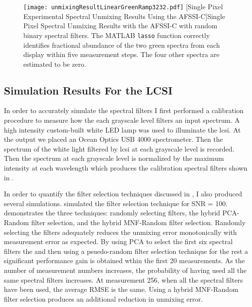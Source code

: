 \begin{figure}[H]
	\centering
	\texttt{[image: unmixingResultLinearGreenRamp3232.pdf]}
	[Single Pixel Experimental Spectral Unmixing Results Using the AFSSI-C]{Single Pixel Spectral Unmixing Results with the AFSSI-C with random binary spectral filters. The MATLAB \texttt{lasso} function correctly identifies fractional abundance of the two green spectra from each display within five measurement steps. The four other spectra are estimated to be zero. }
	\label{fig:unmixingResultLinearGreenRamp3232} 
\end{figure}


\subsection{Simulation Results For the LCSI}

In order to accurately simulate the spectral filters I first performed a calibration procedure to measure how the each grayscale level filters an input spectrum. A high intensity custom-built white LED lamp was used to illuminate the \gls{lcsi}. At the output we placed an Ocean Optics USB 4000 spectrometer. Then the spectrum of the white light filtered by \gls{lcsi} at each grayscale level is recorded. Then the spectrum at each grayscale level is normalized by the maximum intensity at each wavelength which produces the calibration spectral filters shown in .

 In order to quantify the filter selection techniques discussed in , I also produced several simulations. simulated the filter selection technique for SNR = 100.  demonstrates the three techniques: randomly selecting filters, the hybrid PCA-Random filter selection, and the hybrid MNF-Random filter selection. Randomly selecting the filters adequately reduces the unmixing error monotonically with measurement error as expected. By using PCA to select the first six spectral filters the and then using a psuedo-random filter selection technique for the rest a significant performance gain is obtained wthin the first 20 measurements. As the number of measurement numbers increases, the probability of having used all the same spectral filters increases. At measurement 256, when all the spectral filters have been used, the average RMSE is the same. Using a hybrid MNF-Random filter selection produces an additional reduction in unmixing error.


